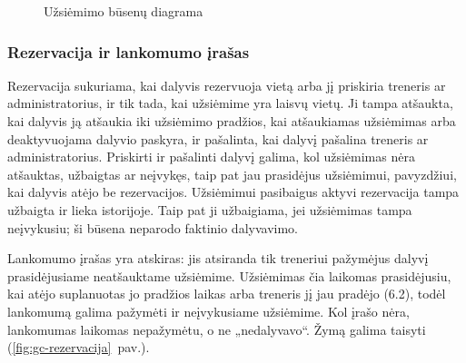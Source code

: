 \begin{figure}[H]
\caption{Užsiėmimo būsenų diagrama}\label{fig:gc-uzsiemimas}
\end{figure}

\subsubsection{Rezervacija ir lankomumo įrašas}\label{sec:gc-rezervacija}

Rezervacija sukuriama, kai dalyvis rezervuoja vietą arba jį priskiria
treneris ar administratorius, ir tik tada, kai užsiėmime yra laisvų vietų.
Ji tampa atšaukta, kai dalyvis ją atšaukia iki užsiėmimo pradžios, kai
atšaukiamas užsiėmimas arba deaktyvuojama dalyvio paskyra, ir pašalinta, kai
dalyvį pašalina treneris ar administratorius. Priskirti ir pašalinti dalyvį
galima, kol užsiėmimas nėra atšauktas, užbaigtas ar neįvykęs, taip pat jau prasidėjus
užsiėmimui, pavyzdžiui, kai dalyvis atėjo be rezervacijos. Užsiėmimui pasibaigus
aktyvi rezervacija tampa užbaigta ir lieka istorijoje. Taip pat ji užbaigiama,
jei užsiėmimas tampa neįvykusiu; ši būsena neparodo faktinio dalyvavimo.

Lankomumo įrašas yra atskiras: jis atsiranda tik treneriui pažymėjus dalyvį
prasidėjusiame neatšauktame užsiėmime. Užsiėmimas čia laikomas prasidėjusiu,
kai atėjo suplanuotas jo pradžios laikas arba treneris jį jau pradėjo (6.2),
todėl lankomumą galima pažymėti ir
neįvykusiame užsiėmime. Kol įrašo nėra, lankomumas laikomas nepažymėtu, o
ne „nedalyvavo“. Žymą galima taisyti (\ref{fig:gc-rezervacija}~pav.).

